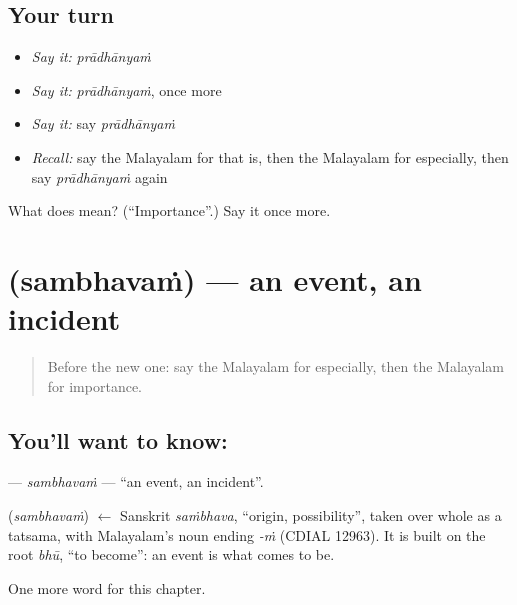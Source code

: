 \subsection*{Your turn}
\begin{itemize}
\raggedright
  \item \emph{Say it:} \emph{prādhānyaṁ}
  \item \emph{Say it:} \emph{prādhānyaṁ}, once more
  \item \emph{Say it:} say \emph{prādhānyaṁ}
  \item \emph{Recall:} say the Malayalam for that is, then the Malayalam for especially, then say \emph{prādhānyaṁ} again
\end{itemize}

\begin{tcolorbox}[breakable,colback=teal!4,colframe=teal!35!black,title={Before you move on}]
What does  mean? (\textquotedblleft{}Importance\textquotedblright{}.) Say it once more.
\end{tcolorbox}
\section[\texorpdfstring{\ml{സംഭവം} (sambhavaṁ)}{സംഭവം (sambhavaṁ)}]{ (sambhavaṁ) — an event, an incident}

\label{lesson:ML-C282-sambhavam}



\begin{quote}
Before the new one: say the Malayalam for especially, then the Malayalam for importance.
\end{quote}

\subsection*{You'll want to know: }
\textbf{} — \emph{sambhavaṁ} — \textquotedblleft{}an event, an incident\textquotedblright{}.

\begin{cousinweb}
\textbf{} (\emph{sambhavaṁ}) $\leftarrow$ Sanskrit \emph{saṁbhava}, \textquotedblleft{}origin, possibility\textquotedblright{}, taken over whole as a tatsama, with Malayalam's noun ending \emph{-ṁ} (CDIAL 12963). It is built on the root \emph{bhū}, \textquotedblleft{}to become\textquotedblright{}: an event is what comes to be.
\end{cousinweb}

\begin{grammarlens}[title={What you've built}]
One more word for this chapter.
\end{grammarlens}

